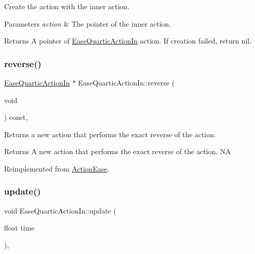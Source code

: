 Create the action with the inner action. 


\begin{DoxyParams}{Parameters}
{\em action} & The pointer of the inner action. \\
\hline
\end{DoxyParams}
\begin{DoxyReturn}{Returns}
A pointer of \hyperlink{classEaseQuarticActionIn}{Ease\+Quartic\+Action\+In} action. If creation failed, return nil. 
\end{DoxyReturn}
\mbox{\label{classEaseQuarticActionIn_a30c40baba57b3dffc444b12fad880b67}} 
\subsubsection{\texorpdfstring{reverse()}{reverse()}}
{\footnotesize\ttfamily \hyperlink{classEaseQuarticActionIn}{Ease\+Quartic\+Action\+In} $\ast$ Ease\+Quartic\+Action\+In\+::reverse (\begin{DoxyParamCaption}\item[{void}]{ }\end{DoxyParamCaption}) const\hspace{0.3cm}{\ttfamily [override]}, {\ttfamily [virtual]}}

Returns a new action that performs the exact reverse of the action.

\begin{DoxyReturn}{Returns}
A new action that performs the exact reverse of the action.  NA 
\end{DoxyReturn}


Reimplemented from \hyperlink{classActionEase_ab99eb083fa033fae1d6c948fdc730782}{Action\+Ease}.

\mbox{\label{classEaseQuarticActionIn_a82026b58ce9a4eee9165380de2dd80dc}} 
\subsubsection{\texorpdfstring{update()}{update()}}
{\footnotesize\ttfamily void Ease\+Quartic\+Action\+In\+::update (\begin{DoxyParamCaption}\item[{float}]{time }\end{DoxyParamCaption})\hspace{0.3cm}{\ttfamily [override]}, {\ttfamily [virtual]}}

